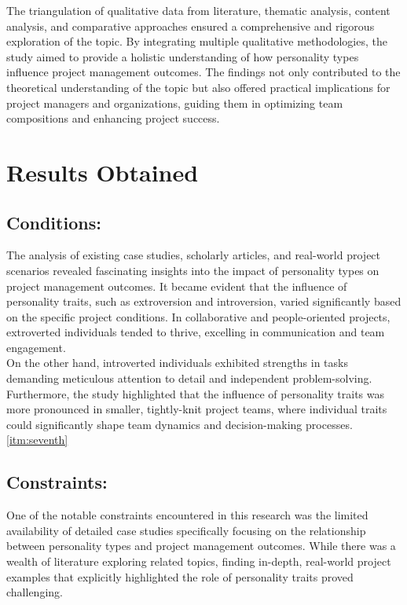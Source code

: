 \documentclass[a4Paper]{article}
\begin{document}
The triangulation of qualitative data from literature, thematic analysis, content analysis, and comparative approaches ensured a comprehensive and rigorous exploration of the topic. By integrating multiple qualitative methodologies, the study aimed to provide a holistic understanding of how personality types influence project management outcomes. The findings not only contributed to the theoretical understanding of the topic but also offered practical implications for project managers and organizations, guiding them in optimizing team compositions and enhancing project success.

\section{Results Obtained}

\subsection{Conditions: } The analysis of existing case studies, scholarly articles, and real-world project scenarios revealed fascinating insights into the impact of personality types on project management outcomes. It became evident that the influence of personality traits, such as extroversion and introversion, varied significantly based on the specific project conditions. In collaborative and people-oriented projects, extroverted individuals tended to thrive, excelling in communication and team engagement.\\

On the other hand, introverted individuals exhibited strengths in tasks demanding meticulous attention to detail and independent problem-solving. Furthermore, the study highlighted that the influence of personality traits was more pronounced in smaller, tightly-knit project teams, where individual traits could significantly shape team dynamics and decision-making processes. \ref{itm:seventh}

\subsection{Constraints: }One of the notable constraints encountered in this research was the limited availability of detailed case studies specifically focusing on the relationship between personality types and project management outcomes. While there was a wealth of literature exploring related topics, finding in-depth, real-world project examples that explicitly highlighted the role of personality traits proved challenging.\\
\end{document}
